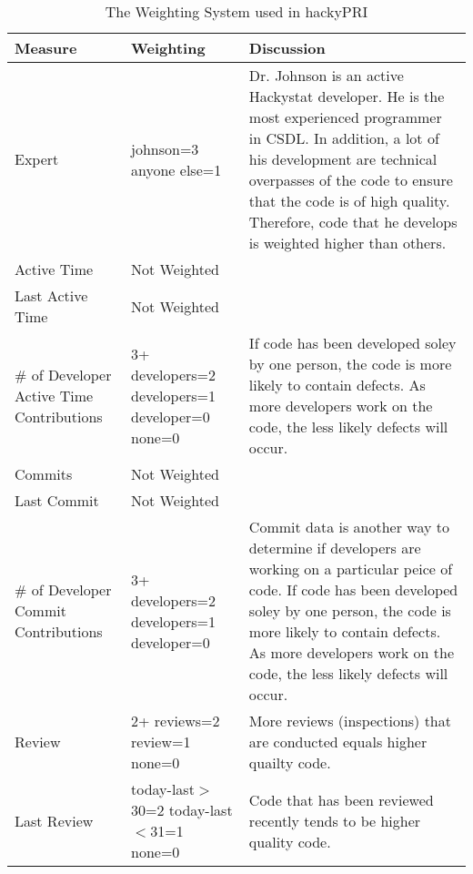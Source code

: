 \begin{table}[htbp]
  \begin{center}
    \caption{The Weighting System used in hackyPRI}
    \label{table:weighting-hackyPRI}
    \begin{tabular}{|p{2.5cm}|p{3.0cm}|p{8.0cm}|} \hline
      {\bf Measure} & {\bf Weighting} & {\bf Discussion} \\ \hline
\small{}Expert & \small{}johnson=3 \newline anyone else=1 &
\small{}Dr. Johnson is an active Hackystat developer. He is the most
experienced programmer in CSDL. In addition, a lot of his development are
technical overpasses of the code to ensure that the code is of high
quality. Therefore, code that he develops is weighted higher than
others. \\ \hline

\small{}Active Time & \small{}Not Weighted  &  \\ \hline
\small{}Last Active Time & \small{}Not Weighted & \\ \hline
\small{}\# of Developer \newline Active Time \newline Contributions & 
\small{}3+ developers=2 \newline 2 developers=1 \newline 1 developer=0
\newline none=0 & \small{}If code has been developed soley by one
person, the code is more likely to contain defects. As more developers work 
on the code, the less likely defects will occur. \\ \hline

\small{}Commits & \small{}Not Weighted & \\ \hline
\small{}Last Commit & \small{}Not Weighted & \\ \hline
\small{}\# of Developer \newline Commit \newline Contributions & \small{} 
\small{}3+ developers=2 \newline 2 developers=1 \newline 1 developer=0 &
\small{}Commit data is another way to determine if developers are working
on a particular peice of code. If code has been developed soley by one
person, the code is more likely to contain defects. As more developers work
on the code, the less likely defects will occur. \\ \hline

\small{}Review & \small{}2+ reviews=2 \newline 1 review=1 \newline none=0 & 
More reviews (inspections) that are conducted equals higher quailty code. \\ \hline
\small{}Last Review & \small{}today-last$>$30=2 \newline today-last$<$31=1
\newline none=0 & \small{}Code that has been reviewed recently tends to be
higher quality code. \\ \hline 


\end{tabular}
\end{center}
\end{table}
